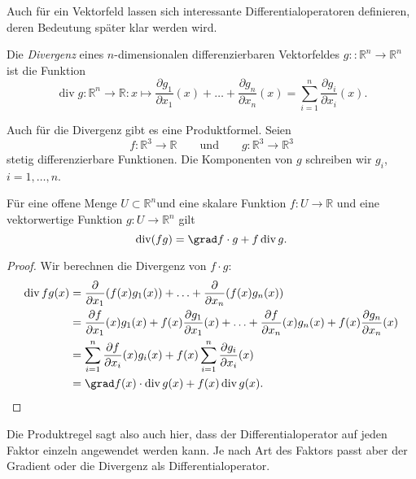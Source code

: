 Auch für ein Vektorfeld lassen sich interessante Differentialoperatoren
definieren, deren Bedeutung später klar werden wird.

\begin{definition}[Divergenz]
\label{buch:felder:fundamentallemme:def:divergenz}
Die {\em Divergenz} eines $n$-dimensionalen differenzierbaren
Vektorfeldes $g\colon:\mathbb{R}^n\to\mathbb{R}^n$ ist die Funktion
\[
\operatorname{div} g
\colon
\mathbb{R}^n\to\mathbb{R}
:
x \mapsto
\frac{\partial g_1}{\partial x_1}(x)
+\ldots+
\frac{\partial g_n}{\partial x_n}(x)
=
\sum_{i=1}^n
\frac{\partial g_i}{\partial x_i}(x).
\]
\end{definition}

Auch für die Divergenz gibt es eine Produktformel.
Seien
\[
f\colon\mathbb{R}^3\to\mathbb{R}
\qquad\text{und}\qquad
g\colon\mathbb{R}^3\to\mathbb{R}^3
\]
stetig differenzierbare Funktionen.
Die Komponenten von $g$ schreiben wir $g_i$, $i=1,\dots,n$.

\begin{satz}
Für eine offene Menge $U\subset\mathbb{R}^n$und
eine skalare Funktion $f\colon U\to\mathbb{R}$ und
eine vektorwertige Funktion $g\colon U\to\mathbb{R}^n$ gilt
\[
\operatorname{div}(fg)
=
\grad f \cdot g
+
f\operatorname{div}g.
\]
\end{satz}

\begin{proof}
Wir berechnen die Divergenz von $f\cdot g$:
\begin{align*}
\operatorname{div} fg(x)
&=
\frac{\partial}{\partial x_1}(f(x)g_1(x))
+
\ldots
+
\frac{\partial}{\partial x_n}(f(x)g_n(x))
\\
&=
\frac{\partial f}{\partial x_1}(x)g_1(x)
+f(x)\frac{\partial g_1}{\partial x_1}(x)
+
\ldots
+
\frac{\partial f}{\partial x_n}(x)g_n(x)
+f(x)\frac{\partial g_n}{\partial x_n}(x)
\\
&=
\sum_{i=1}^n \frac{\partial f}{\partial x_i}(x) g_i(x)
+
f(x)
\sum_{i=1}^n \frac{\partial g_i}{\partial x_i}(x)
\\
&=
\grad f(x)\cdot \operatorname{div} g(x)
+
f(x)\operatorname{div}g(x).
\qedhere
\end{align*}
\end{proof}

Die Produktregel sagt also auch hier, dass der Differentialoperator
auf jeden Faktor einzeln angewendet werden kann. 
Je nach Art des Faktors passt aber der Gradient oder die Divergenz
als Differentialoperator.

%
%
